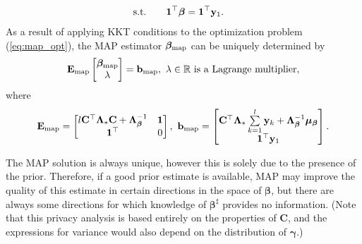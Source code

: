 \documentclass[a4paper, 11pt]{article}
\newcommand{\R}{\mathbb{R}}
\newcommand{\1}{\mathbf{1}}
\DeclareMathOperator*{\argmin}{argmin}
\newcommand{\xb}{\mathbf{x}}
\newcommand{\yb}{\mathbf{y}}
\newcommand{\Cb}{\mathbf{C}}
\newcommand{\gammab}{{\bm \gamma}}
\newcommand{\betab}{\bm{\beta}}
\newcommand{\mub}{\bm{\mu}}
\newcommand{\Lambdab}{\bm{\Lambda}}
\newcommand{\betamapfs}{{\betab}_{\textnormal{map}}}
\newcommand{\emapfs}{\mathbf{E}_{\textnormal{map}}}
\newcommand{\bmapfs}{\mathbf{b}_{\textnormal{map}}}
\begin{document}
{{\begin{equation}
\begin{aligned}
		{\rm s.t.} \qquad  &   \1^\top\betab=\1^\top\yb_1.
		\end{aligned}
		\end{equation}
		As a result of applying KKT conditions to the optimization problem (\ref{eq:map_opt}), the MAP estimator $\betamapfs$ can be uniquely determined by 
		\begin{equation}\notag
		\begin{aligned}
		\emapfs
		\begin{bmatrix}
		\betamapfs\\
		\lambda
		\end{bmatrix}=
		\bmapfs,\ \lambda\in\R\textnormal{ is a Lagrange multiplier},
		\end{aligned}
		\end{equation}
		where
		\begin{equation}\notag
		\begin{aligned}
		\emapfs=
		\begin{bmatrix}
		l\Cb^\top\Lambdab_\ast \Cb+\Lambdab_{\betab}^{-1} & \1\\
		\1^\top & 0
		\end{bmatrix},\ 
		\bmapfs=
		\begin{bmatrix}
		\Cb^\top\Lambdab_\ast \sum\limits_{k=1}^l\yb_k+\Lambdab_{\betab}^{-1}\mub_{\betab}\\
		\1^\top\yb_1
		\end{bmatrix}.
		\end{aligned}
		\end{equation}
	}
	
	The MAP solution is always unique, however this is solely due to the presence of the prior. Therefore, if a good prior estimate is available, MAP may improve the quality of this estimate in certain directions in the space of $\betab$, but there are always some directions for which knowledge of $\betab^\sharp$ provides no information.
(Note that this privacy analysis is based entirely on the properties of $\mathbf{C}$, and the expressions for variance would also depend on the distribution of $\gammab$.)


}
\end{document}
